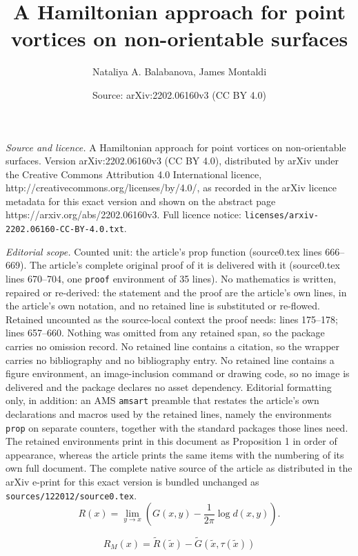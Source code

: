 \documentclass[10pt,a4paper]{amsart}
\title{A Hamiltonian approach for point vortices on non-orientable surfaces}
\author{Nataliya A. Balabanova, James Montaldi}
\date{Source: arXiv:2202.06160v3 (CC BY 4.0)}
\def\Gt{\widetilde{G}}
\def\Rt{\widetilde{R}}
\def\xt{\tilde{x}}
\begin{document}
\maketitle

\noindent\emph{Source and licence.} A Hamiltonian approach for point vortices on non-orientable surfaces. Version arXiv:2202.06160v3 (CC BY 4.0), distributed by arXiv under the Creative Commons Attribution 4.0 International licence, http://creativecommons.org/licenses/by/4.0/, as recorded in the arXiv licence metadata for this exact version and shown on the abstract page https://arxiv.org/abs/2202.06160v3. Full licence notice: \texttt{licenses/arxiv-2202.06160-CC-BY-4.0.txt}.\par\smallskip

\noindent\textit{Editorial scope.} Counted unit: the article's prop function (source0.tex lines 666--669). The article's complete original proof of it is delivered with it (source0.tex lines 670--704, one \texttt{proof} environment of 35 lines). No mathematics is written, repaired or re-derived: the statement and the proof are the article's own lines, in the article's own notation, and no retained line is substituted or re-flowed.  Retained uncounted as the source-local context the proof needs: lines 175--178; lines 657--660.  Nothing was omitted from any retained span, so the package carries no omission record.  No retained line contains a citation, so the wrapper carries no bibliography and no bibliography entry.  No retained line contains a figure environment, an image-inclusion command or drawing code, so no image is delivered and the package declares no asset dependency.  Editorial formatting only, in addition: an AMS \texttt{amsart} preamble that restates the article's own declarations and macros used by the retained lines, namely the environments \texttt{prop} on separate counters, together with the standard packages those lines need.  The retained environments print in this document as Proposition 1 in order of appearance, whereas the article prints the same items with the numbering of its own full document.  The complete native source of the article as distributed in the arXiv e-print for this exact version is bundled unchanged as \texttt{sources/122012/source0.tex}.
\begin{equation}
\label{eq: Robin function definition}
R(x) = \lim_{y\to x} \left(G(x,y) -\frac1{2\pi}\log d(x,y)\right).
\end{equation}

\begin{equation}
\label{eq: twisted Robin}
     R_M(x) = \Rt(\xt)-\Gt(\xt,\tau(\xt))
\end{equation}
\end{document}
